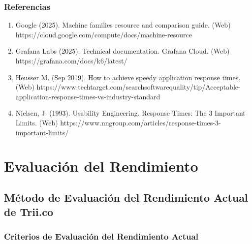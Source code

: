 \documentclass[
  paper=a4,
  ,captions=tableheading
]{scrartcl}
\providecommand{\tightlist}{%
  \setlength{\itemsep}{0pt}\setlength{\parskip}{0pt}}
\renewenvironment{quote}{\begin{customblockquote}\list{}{\rightmargin=0em\leftmargin=0em}%
\item\relax\color{blockquote-text}\ignorespaces}{\unskip\unskip\endlist\end{customblockquote}}
\begin{document}
\subsubsection{Referencias}\label{sec:referencias-1}

\begin{enumerate}
\def\labelenumi{\arabic{enumi}.}
\tightlist
\item
  Google (2025). Machine families resource and comparison guide. (Web)
  https://cloud.google.com/compute/docs/machine-resource
\item
  Grafana Labs (2025). Technical documentation. Grafana Cloud. (Web)
  https://grafana.com/docs/k6/latest/
\item
  Heusser M. (Sep 2019). How to achieve speedy application response
  times. (Web)
  https://www.techtarget.com/searchsoftwarequality/tip/Acceptable-application-response-times-vs-industry-standard
\item
  Nielsen, J. (1993). Usability Engineering. Response Times: The 3
  Important Limits. (Web)
  https://www.nngroup.com/articles/response-times-3-important-limits/
\end{enumerate}

\newpage

\section{Evaluación del
Rendimiento}\label{sec:evaluaciuxf3n-del-rendimiento}

\subsection{Método de Evaluación del Rendimiento Actual de
Trii.co}\label{sec:muxe9todo-de-evaluaciuxf3n-del-rendimiento-actual-de-trii.co}

\begin{quote}
\end{quote}

\subsubsection{Criterios de Evaluación del Rendimiento
Actual}\label{sec:criterios-de-evaluaciuxf3n-del-rendimiento-actual}
\end{document}
